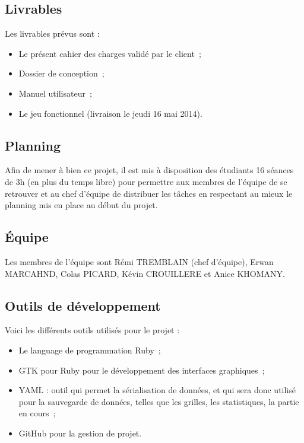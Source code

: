 \documentclass[11pt]{article}
\begin{document}
\subsection{Livrables}

Les livrables prévus sont :

\begin{itemize}
   \item Le présent cahier des charges validé par le client~;
   \item Dossier de conception~;
   \item Manuel utilisateur~;
   \item Le jeu fonctionnel (livraison le jeudi 16 mai 2014).
\end{itemize}


\subsection{Planning}

Afin de mener à bien ce projet, il est mis à disposition des étudiants 16 séances de 3h (en plus du temps libre) pour permettre aux membres de l'équipe de se retrouver et au chef d'équipe de distribuer les tâches en respectant au mieux le planning mis en place au début du projet.



\subsection{Équipe}

Les membres de l'équipe sont Rémi TREMBLAIN (chef d'équipe), Erwan MARCAHND, Colas PICARD, Kévin CROUILLERE et Anice KHOMANY.





\subsection{Outils de développement}

Voici les différents outils utilisés pour le projet :

\begin{itemize}
   \item Le language de programmation Ruby~;
   \item GTK pour Ruby pour le développement des interfaces graphiques~;
   \item YAML : outil qui permet la sérialisation de données, et qui sera donc utilisé pour la sauvegarde de données, telles que les grilles, les statistiques, la partie en cours~;
   \item GitHub pour la gestion de projet.
\end{itemize}
\end{document}
